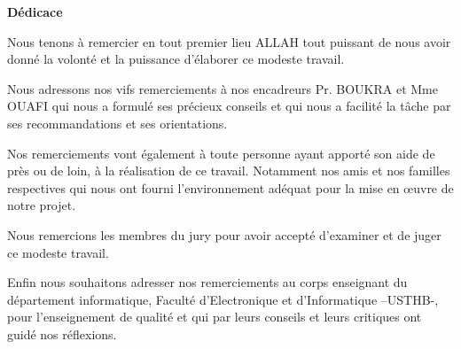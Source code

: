 
\thispagestyle{empty}

\begin{center}
	\LARGE\textbf{Dédicace}
\end{center}

\Large{Nous tenons à remercier en tout premier lieu ALLAH tout  puissant de nous avoir donné la volonté et la puissance d’élaborer ce modeste travail.

Nous adressons nos vifs remerciements à nos encadreurs Pr. BOUKRA et Mme OUAFI qui nous a formulé ses précieux conseils et qui nous a  facilité la tâche par ses recommandations et ses  orientations.

Nos remerciements vont également à toute personne ayant apporté son aide de près ou de loin, à la réalisation de ce travail. Notamment nos amis et nos familles respectives qui nous ont fourni l'environnement adéquat pour la mise en œuvre de notre projet.

Nous remercions les membres du jury pour avoir accepté d’examiner et de juger ce modeste travail.

Enfin nous souhaitons adresser nos remerciements au corps enseignant du département informatique, Faculté d'Electronique et d'Informatique –USTHB-, pour l'enseignement de qualité et qui par leurs conseils et leurs critiques ont guidé nos réflexions.}